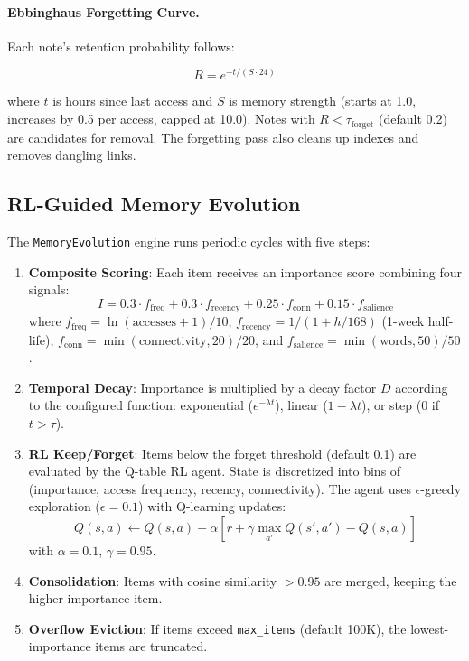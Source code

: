 \documentclass[11pt,a4paper,twocolumn]{article}
\begin{document}
\paragraph{Ebbinghaus Forgetting Curve.}
Each note's retention probability follows:

\begin{equation}
R = e^{-t / (S \cdot 24)}
\label{eq:ebbinghaus}
\end{equation}

where $t$ is hours since last access and $S$ is memory strength
(starts at 1.0, increases by 0.5 per access, capped at 10.0).
Notes with $R < \tau_\text{forget}$ (default 0.2) are candidates
for removal. The forgetting pass also cleans up indexes and
removes dangling links.

\subsection{RL-Guided Memory Evolution}

The \texttt{MemoryEvolution} engine runs periodic cycles with
five steps:

\begin{enumerate}[leftmargin=*]
  \item \textbf{Composite Scoring}: Each item receives an importance
    score combining four signals:
    \begin{equation}
    I = 0.3 \cdot f_\text{freq} + 0.3 \cdot f_\text{recency}
      + 0.25 \cdot f_\text{conn} + 0.15 \cdot f_\text{salience}
    \end{equation}
    where $f_\text{freq} = \ln(\text{accesses}+1)/10$,
    $f_\text{recency} = 1/(1+h/168)$ (1-week half-life),
    $f_\text{conn} = \min(\text{connectivity}, 20)/20$,
    and $f_\text{salience} = \min(\text{words}, 50)/50$.

  \item \textbf{Temporal Decay}: Importance is multiplied by a
    decay factor $D$ according to the configured function:
    exponential ($e^{-\lambda t}$), linear ($1 - \lambda t$),
    or step (0 if $t > \tau$).

  \item \textbf{RL Keep/Forget}: Items below the forget threshold
    (default 0.1) are evaluated by the Q-table RL agent. State is
    discretized into bins of (importance, access frequency, recency,
    connectivity). The agent uses $\epsilon$-greedy exploration
    ($\epsilon=0.1$) with Q-learning updates:
    \begin{equation}
    Q(s,a) \leftarrow Q(s,a) + \alpha[r + \gamma \max_{a'} Q(s',a')
      - Q(s,a)]
    \end{equation}
    with $\alpha=0.1$, $\gamma=0.95$.

  \item \textbf{Consolidation}: Items with cosine similarity $> 0.95$
    are merged, keeping the higher-importance item.

  \item \textbf{Overflow Eviction}: If items exceed
    \texttt{max\_items} (default 100K), the lowest-importance items
    are truncated.
\end{enumerate}
\end{document}
